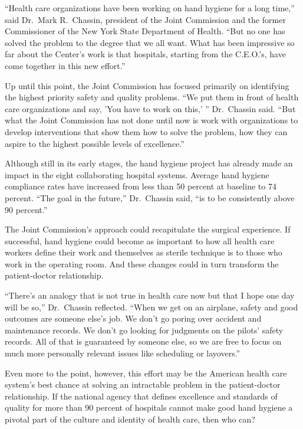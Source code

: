 ﻿\documentclass[12pt]{article}
\begin{document}
``Health care organizations have been working on hand hygiene for a long time,'' said Dr.~Mark
R.~Chassin, president of the Joint Commission and the former Commissioner of the New York State
Department of Health. ``But no one has solved the problem to the degree that we all want. What has
been impressive so far about the Center's work is that hospitals, starting from the C.E.O.'s, have
come together in this new effort.''

Up until this point, the Joint Commission has focused primarily on identifying the highest priority
safety and quality problems. ``We put them in front of health care organizations and say, 'You have
to work on this,' '' Dr.~Chassin said. ``But what the Joint Commission has not done until now is
work with organizations to develop interventions that show them how to solve the problem, how they
can aspire to the highest possible levels of excellence.''

Although still in its early stages, the hand hygiene project has already made an impact in the eight
collaborating hospital systems. Average hand hygiene compliance rates have increased from less than
50 percent at baseline to 74 percent. ``The goal in the future,'' Dr.~Chassin said, ``is to be
consistently above 90 percent.''

The Joint Commission's approach could recapitulate the surgical experience. If successful, hand
hygiene could become as important to how all health care workers define their work and themselves as
sterile technique is to those who work in the operating room. And these changes could in turn
transform the patient-doctor relationship.

``There's an analogy that is not true in health care now but that I hope one day will be so,''
Dr.~Chassin reflected. ``When we get on an airplane, safety and good outcomes are someone else's
job. We don't go poring over accident and maintenance records. We don't go looking for judgments on
the pilots' safety records. All of that is guaranteed by someone else, so we are free to focus on
much more personally relevant issues like scheduling or layovers.''

Even more to the point, however, this effort may be the American health care system's best chance at
solving an intractable problem in the patient-doctor relationship. If the national agency that
defines excellence and standards of quality for more than 90 percent of hospitals cannot make good
hand hygiene a pivotal part of the culture and identity of health care, then who can?
\end{document}
